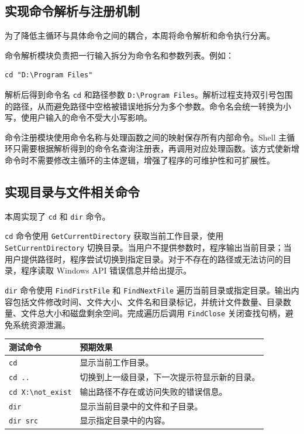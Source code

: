 \documentclass[UTF8]{ctexart}
\begin{document}
\subsection{实现命令解析与注册机制}

为了降低主循环与具体命令之间的耦合，本周将命令解析和命令执行分离。

命令解析模块负责把一行输入拆分为命令名和参数列表。例如：

\begin{verbatim}
cd "D:\Program Files"
\end{verbatim}

解析后得到命令名 \texttt{cd} 和路径参数 \texttt{D:\textbackslash Program Files}。解析过程支持双引号包围的路径，从而避免路径中空格被错误地拆分为多个参数。命令名会统一转换为小写，使用户输入的命令不受大小写影响。

命令注册模块使用命令名称与处理函数之间的映射保存所有内部命令。Shell 主循环只需要根据解析得到的命令名查询注册表，再调用对应处理函数。该方式使新增命令时不需要修改主循环的主体逻辑，增强了程序的可维护性和可扩展性。

\subsection{实现目录与文件相关命令}

本周实现了 \texttt{cd} 和 \texttt{dir} 命令。

\texttt{cd} 命令使用 \texttt{GetCurrentDirectory} 获取当前工作目录，使用 \texttt{SetCurrentDirectory} 切换目录。当用户不提供参数时，程序输出当前目录；当用户提供路径时，程序尝试切换到指定目录。对于不存在的路径或无法访问的目录，程序读取 Windows API 错误信息并给出提示。

\texttt{dir} 命令使用 \texttt{FindFirstFile} 和 \texttt{FindNextFile} 遍历当前目录或指定目录。输出内容包括文件修改时间、文件大小、文件名和目录标记，并统计文件数量、目录数量、文件总大小和磁盘剩余空间。完成遍历后调用 \texttt{FindClose} 关闭查找句柄，避免系统资源泄漏。

\begin{longtable}{p{4cm}p{10cm}}
\toprule
测试命令 & 预期效果 \\
\midrule
\texttt{cd} & 显示当前工作目录。 \\
\texttt{cd ..} & 切换到上一级目录，下一次提示符显示新的目录。 \\
\texttt{cd X:\textbackslash not\_exist} & 输出路径不存在或访问失败的错误信息。 \\
\texttt{dir} & 显示当前目录中的文件和子目录。 \\
\texttt{dir src} & 显示指定目录中的内容。 \\
\bottomrule
\end{longtable}
\end{document}
